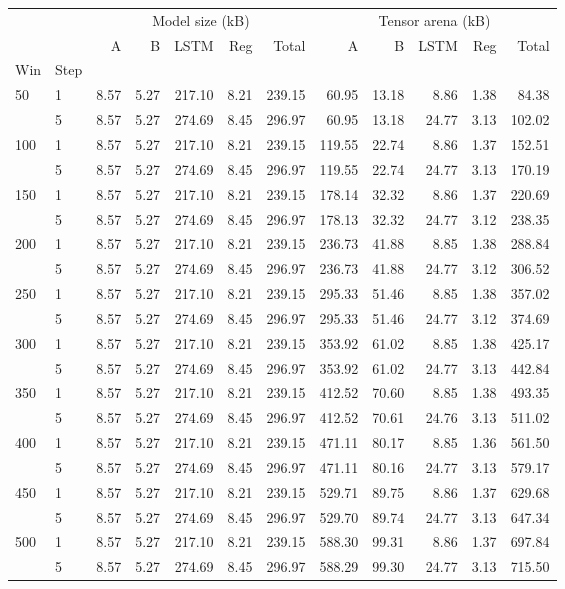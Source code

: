 \begin{tabular}{llrrrrrrrrrr}
\toprule
 &  & \multicolumn{5}{c}{Model size (kB)} & \multicolumn{5}{c}{Tensor arena (kB)} \\
 &  & A & B & LSTM & Reg & Total & A & B & LSTM & Reg & Total \\
Win & Step &  &  &  &  &  &  &  &  &  &  \\
\midrule
\multirow[t]{2}{*}{50} & 1 & 8.57 & 5.27 & 217.10 & 8.21 & 239.15 & 60.95 & 13.18 & 8.86 & 1.38 & 84.38 \\
 & 5 & 8.57 & 5.27 & 274.69 & 8.45 & 296.97 & 60.95 & 13.18 & 24.77 & 3.13 & 102.02 \\
\cline{1-12}
\multirow[t]{2}{*}{100} & 1 & 8.57 & 5.27 & 217.10 & 8.21 & 239.15 & 119.55 & 22.74 & 8.86 & 1.37 & 152.51 \\
 & 5 & 8.57 & 5.27 & 274.69 & 8.45 & 296.97 & 119.55 & 22.74 & 24.77 & 3.13 & 170.19 \\
\cline{1-12}
\multirow[t]{2}{*}{150} & 1 & 8.57 & 5.27 & 217.10 & 8.21 & 239.15 & 178.14 & 32.32 & 8.86 & 1.37 & 220.69 \\
 & 5 & 8.57 & 5.27 & 274.69 & 8.45 & 296.97 & 178.13 & 32.32 & 24.77 & 3.12 & 238.35 \\
\cline{1-12}
\multirow[t]{2}{*}{200} & 1 & 8.57 & 5.27 & 217.10 & 8.21 & 239.15 & 236.73 & 41.88 & 8.85 & 1.38 & 288.84 \\
 & 5 & 8.57 & 5.27 & 274.69 & 8.45 & 296.97 & 236.73 & 41.88 & 24.77 & 3.12 & 306.52 \\
\cline{1-12}
\multirow[t]{2}{*}{250} & 1 & 8.57 & 5.27 & 217.10 & 8.21 & 239.15 & 295.33 & 51.46 & 8.85 & 1.38 & 357.02 \\
 & 5 & 8.57 & 5.27 & 274.69 & 8.45 & 296.97 & 295.33 & 51.46 & 24.77 & 3.12 & 374.69 \\
\cline{1-12}
\multirow[t]{2}{*}{300} & 1 & 8.57 & 5.27 & 217.10 & 8.21 & 239.15 & 353.92 & 61.02 & 8.85 & 1.38 & 425.17 \\
 & 5 & 8.57 & 5.27 & 274.69 & 8.45 & 296.97 & 353.92 & 61.02 & 24.77 & 3.13 & 442.84 \\
\cline{1-12}
\multirow[t]{2}{*}{350} & 1 & 8.57 & 5.27 & 217.10 & 8.21 & 239.15 & 412.52 & 70.60 & 8.85 & 1.38 & 493.35 \\
 & 5 & 8.57 & 5.27 & 274.69 & 8.45 & 296.97 & 412.52 & 70.61 & 24.76 & 3.13 & 511.02 \\
\cline{1-12}
\multirow[t]{2}{*}{400} & 1 & 8.57 & 5.27 & 217.10 & 8.21 & 239.15 & 471.11 & 80.17 & 8.85 & 1.36 & 561.50 \\
 & 5 & 8.57 & 5.27 & 274.69 & 8.45 & 296.97 & 471.11 & 80.16 & 24.77 & 3.13 & 579.17 \\
\cline{1-12}
\multirow[t]{2}{*}{450} & 1 & 8.57 & 5.27 & 217.10 & 8.21 & 239.15 & 529.71 & 89.75 & 8.86 & 1.37 & 629.68 \\
 & 5 & 8.57 & 5.27 & 274.69 & 8.45 & 296.97 & 529.70 & 89.74 & 24.77 & 3.13 & 647.34 \\
\cline{1-12}
\multirow[t]{2}{*}{500} & 1 & 8.57 & 5.27 & 217.10 & 8.21 & 239.15 & 588.30 & 99.31 & 8.86 & 1.37 & 697.84 \\
 & 5 & 8.57 & 5.27 & 274.69 & 8.45 & 296.97 & 588.29 & 99.30 & 24.77 & 3.13 & 715.50 \\
\cline{1-12}
\bottomrule
\end{tabular}
